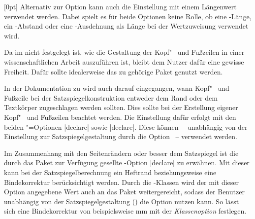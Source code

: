\begin{Declaration*}{}
\begin{Declaration*}{}
\begin{Declaration*}{}
\begin{Declaration}[v2.03]{}[0pt]
Alternativ zur Option  kann auch die Einstellung 
 mit einem Längenwert verwendet werden. 
Dabei spielt es für beide Optionen keine Rolle, ob eine -Länge, 
ein -Abstand oder eine -Ausdehnung als Länge bei der 
Wertzuweisung verwendet wird.
\end{Declaration}

%
%
%
Da im \CD nicht festgelegt ist, wie die Gestaltung der Kopf"~ und Fußzeilen in 
einer wissenschaftlichen Arbeit auszuführen ist, bleibt dem Nutzer dafür eine 
gewisse Freiheit. Dafür sollte idealerweise das zu \KOMAScript{} gehörige Paket 
 genutzt werden. 

In der Dokumentation zu  wird auch darauf eingegangen, wann 
Kopf"~ und Fußzeile bei der Satzspiegelkonstruktion entweder dem Rand oder dem 
Textkörper zugeschlagen werden sollten. Dies sollte bei der Erstellung eigener 
Kopf"~ und Fußzeilen beachtet werden. Die Einstellung dafür erfolgt mit den 
beiden \KOMAScript"=Optionen |declare| sowie 
|declare|. Diese können~-- unabhängig von der 
Einstellung zur Satzspiegelgestaltung durch die Option ~-- 
verwendet werden.

%
%
Im Zusammenhang mit den Seitenrändern oder besser dem Satzspiegel ist die durch 
das Paket  zur Verfügung gesellte \KOMAScript-Option 
|declare| zu erwähnen. Mit dieser kann bei der 
Satzspiegelberechnung ein Heftrand beziehungsweise eine Bindekorrektur 
berücksichtigt werden. Durch die \TUDScript-Klassen wird der mit dieser Option 
angegebene Wert auch an das Paket  weitergereicht, sodass der 
Benutzer unabhängig von der Satzspiegelgestaltung () die 
Option  nutzen kann. So lässt sich eine Bindekorrektur von 
beispielsweise \unit[5]{mm} mit der \emph{Klassenoption}  
festlegen.


\end{Declaration*}
\end{Declaration*}
\end{Declaration*}
